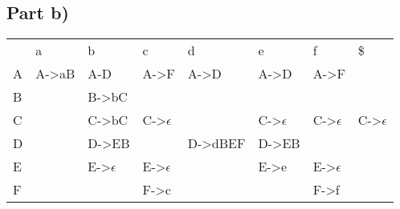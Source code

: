 \documentclass[paper=a4, fontsize=11pt]{scrartcl} %
\numberwithin{equation}{section} %
\numberwithin{figure}{section} %
\numberwithin{table}{section} %
\begin{document}
\subsection{Part b)}
\begin{center}
    \begin{tabular}{ | l || l | l | l | l | l | l | l | }
    \hline
        & a         & b             & c             & d         & e             & f                 &   \$              \\
    \hhline{|=||=|=|=|=|=|=|=|}
    A   & A->aB     & A-D           & A->F          & A->D      & A->D          & A->F              &                   \\
    \hline
    B   &           & B->bC         &               &           &               &                   &                   \\
    \hline
    C   &           & C->bC         & C->$\epsilon$ &           & C->$\epsilon$ & C->$\epsilon$     & C->$\epsilon$     \\
    \hline
    D   &           & D->EB         &               & D->dBEF   & D->EB         &                   &                   \\
    \hline
    E   &           & E->$\epsilon$ & E->$\epsilon$ &           & E->e          & E->$\epsilon$     &                   \\
    \hline
    F   &           &               & F->c          &           &               & F->f              &                   \\
    \hline
    \end{tabular}
\end{center}
\end{document}
